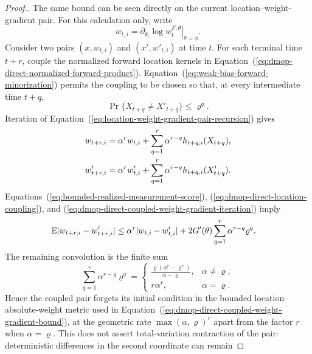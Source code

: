 \documentclass[11pt]{article}
\theoremstyle{thmstylethree}%
\begin{document}
\begin{proof}[Proof.]
The same bound can be seen directly on the current location--weight-gradient
pair.  For this calculation only, write
\begin{equation}
w_{t,i}
=
\left.\partial_{\theta_i}\log w_t^{F,\theta}\right|_{\theta=\phi}.
\end{equation}
Consider two pairs $(x,w_{t,i})$ and $(x',w'_{t,i})$ at time $t$.
For each terminal time $t+r$, couple the normalized forward location
kernels in Equation~(\ref{eq:dmop-direct-normalized-forward-product}).
Equation~(\ref{eq:weak-bias-forward-minorization}) permits the coupling
to be chosen so that, at every intermediate time $t+q$,
\begin{equation}
\Pr\{X_{t+q}\ne X'_{t+q}\}
\leq
\varrho^q.
\label{eq:dmop-direct-location-coupling}
\end{equation}
Iteration of Equation~(\ref{eq:location-weight-gradient-pair-recursion})
gives
\begin{align}
w_{t+r,i}
&=
\alpha^r w_{t,i}
+\sum_{q=1}^{r}\alpha^{r-q}h_{t+q,i}(X_{t+q}),             \notag\\
w'_{t+r,i}
&=
\alpha^r w'_{t,i}
+\sum_{q=1}^{r}\alpha^{r-q}h_{t+q,i}(X'_{t+q}).
\label{eq:dmop-direct-coupled-weight-gradient-iteration}
\end{align}
Equations~(\ref{eq:bounded-realized-measurement-score}),
(\ref{eq:dmop-direct-location-coupling}), and
(\ref{eq:dmop-direct-coupled-weight-gradient-iteration}) imply
\begin{align}
\mathbb{E}|w_{t+r,i}-w'_{t+r,i}|
&\leq
\alpha^r|w_{t,i}-w'_{t,i}|
+2G'(\theta)\sum_{q=1}^{r}\alpha^{r-q}\varrho^q.
\label{eq:dmop-direct-coupled-weight-gradient-bound}
\end{align}
The remaining convolution is the finite sum
\begin{equation}
\sum_{q=1}^{r}\alpha^{r-q}\varrho^q
=
\begin{cases}
\displaystyle
\frac{\varrho(\alpha^r-\varrho^r)}{\alpha-\varrho},
&\alpha\ne\varrho,\\[2mm]
r\alpha^r,&\alpha=\varrho.
\end{cases}
\label{eq:dmop-direct-pair-forgetting-convolution}
\end{equation}
Hence the coupled pair forgets its initial condition in the bounded
location--absolute-weight metric used in
Equation~(\ref{eq:dmop-direct-coupled-weight-gradient-bound}), at the
geometric rate $\max(\alpha,\varrho)^r$ apart from the factor $r$ when
$\alpha=\varrho$.  This does not assert total-variation contraction of
the pair: deterministic differences in the second coordinate can remain

\end{proof}
\end{document}
